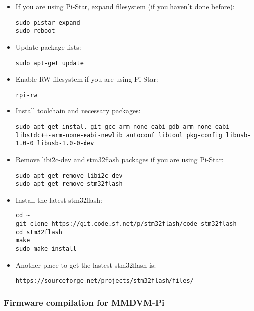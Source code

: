 \documentclass[]{article}
\begin{document}
\begin{itemize}[leftmargin=*]
	
\item If you are using Pi-Star, expand filesystem (if you haven't done before):
\begin{lstlisting}[style=DOS]
sudo pistar-expand
sudo reboot
\end{lstlisting}

\item Update package lists:
\begin{lstlisting}[style=DOS]
sudo apt-get update
\end{lstlisting}

\item Enable RW filesystem if you are using Pi-Star:
\begin{lstlisting}[style=DOS]
rpi-rw
\end{lstlisting}

\item Install toolchain and necessary packages:
\begin{lstlisting}[style=DOS]
sudo apt-get install git gcc-arm-none-eabi gdb-arm-none-eabi libstdc++-arm-none-eabi-newlib autoconf libtool pkg-config libusb-1.0-0 libusb-1.0-0-dev
\end{lstlisting}

\item Remove libi2c-dev and stm32flash packages if you are using Pi-Star:
\begin{lstlisting}[style=DOS]
sudo apt-get remove libi2c-dev
sudo apt-get remove stm32flash
\end{lstlisting}

\item Install the latest stm32flash:
\begin{lstlisting}[style=DOS]
cd ~
git clone https://git.code.sf.net/p/stm32flash/code stm32flash
cd stm32flash
make
sudo make install
\end{lstlisting}

\item Another place to get the lastest stm32flash is:

\begin{verbatim}
https://sourceforge.net/projects/stm32flash/files/
\end{verbatim}

\end{itemize}

\subsubsection{Firmware compilation for MMDVM-Pi}
\end{document}
